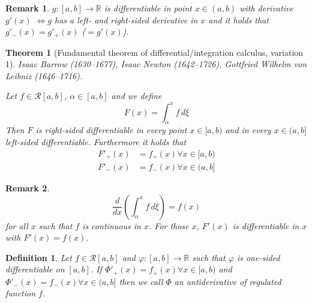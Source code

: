 \documentclass{article}
\newtheorem{theorem}{Theorem}  \numberwithin{theorem}{section}
\newtheorem{definition}{Definition}  \numberwithin{definition}{section}
\newtheorem{remark}{Remark}  \numberwithin{remark}{section}
\begin{document}
\begin{remark}
  $g: [a,b] \to \mathbb R$ is differentiable in point $x \in (a,b)$ with derivative $g'(x)$
  $\iff g$ has a left- and right-sided derivative in $x$ and it holds that $g'_-(x) = g'_+(x)$ ($= g'(x)$).
\end{remark}

\begin{theorem}[Fundamental theorem of differential/integration calculus, variation 1] %
  \label{ftofic}
  Isaac Barrow (1630--1677), Isaac Newton (1642--1726), Gottfried Wilhelm von Leibniz (1646--1716).

  Let $f \in \mathcal R[a,b]$, $\alpha \in [a,b]$ and we define
  \[ F(x) = \int_{\alpha}^x f \, d\xi \]
  Then $F$ is right-sided differentiable in every point $x \in [a,b)$ and in every $x \in (a,b]$ left-sided differentiable.
  Furthermore it holds that
  \begin{align}
    \label{ftdi}
    F'_+(x) &= f_+(x) \forall x \in [a,b) \\
    F'_-(x) &= f_-(x) \forall x \in (a,b]
  \end{align}
\end{theorem}

\begin{remark}
  \[ \frac{d}{dx} \left(\int_\alpha^x f \, d\xi\right) = f(x) \]
  for all $x$ such that $f$ is continuous in $x$.
  For those $x$, $F'(x)$ is differentiable in $x$ with $F'(x) = f(x)$.
\end{remark}

\begin{definition} %
  \label{def10}
  Let $f \in \mathcal R[a,b]$ and $\varphi: [a,b] \to \mathbb R$ such that $\varphi$ is one-sided differentiable on $[a,b]$.
  If $\Phi'_+(x) = f_+(x) \forall x \in [a,b)$ and $\Phi'_-(x) = f_-(x) \forall x \in (a,b]$
  then we call $\Phi$ an antiderivative of regulated function $f$.
\end{definition}
\end{document}
